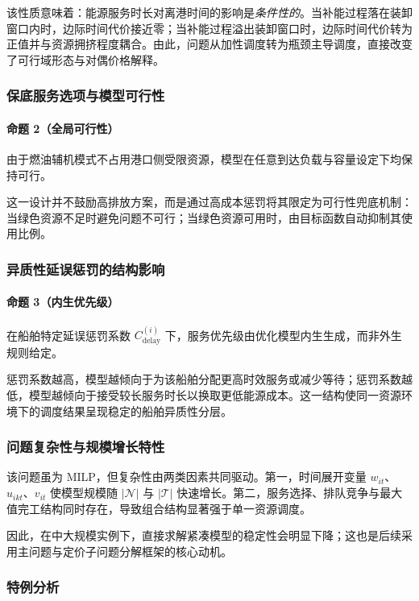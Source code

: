 \documentclass[UTF8, a4paper, 12pt]{ctexart}
\theoremstyle{plain}
\theoremstyle{definition}
\theoremstyle{remark}
\begin{document}
该性质意味着：能源服务时长对离港时间的影响是\emph{条件性的}。当补能过程落在装卸窗口内时，边际时间代价接近零；当补能过程溢出装卸窗口时，边际时间代价转为正值并与资源拥挤程度耦合。由此，问题从加性调度转为瓶颈主导调度，直接改变了可行域形态与对偶价格解释。

\subsubsection{保底服务选项与模型可行性}

\paragraph{命题 2（全局可行性）}
由于燃油辅机模式不占用港口侧受限资源，模型在任意到达负载与容量设定下均保持可行。

这一设计并不鼓励高排放方案，而是通过高成本惩罚将其限定为可行性兜底机制：当绿色资源不足时避免问题不可行；当绿色资源可用时，由目标函数自动抑制其使用比例。

\subsubsection{异质性延误惩罚的结构影响}

\paragraph{命题 3（内生优先级）}
在船舶特定延误惩罚系数 $C^{(i)}_{\text{delay}}$ 下，服务优先级由优化模型内生生成，而非外生规则给定。

惩罚系数越高，模型越倾向于为该船舶分配更高时效服务或减少等待；惩罚系数越低，模型越倾向于接受较长服务时长以换取更低能源成本。这一结构使同一资源环境下的调度结果呈现稳定的船舶异质性分层。

\subsubsection{问题复杂性与规模增长特性}

该问题虽为 MILP，但复杂性由两类因素共同驱动。第一，时间展开变量 $w_{it}$、$u_{ikt}$、$v_{it}$ 使模型规模随 $|\mathcal{N}|$ 与 $|\mathcal{T}|$ 快速增长。第二，服务选择、排队竞争与最大值完工结构同时存在，导致组合结构显著强于单一资源调度。

因此，在中大规模实例下，直接求解紧凑模型的稳定性会明显下降；这也是后续采用主问题与定价子问题分解框架的核心动机。

\subsubsection{特例分析}
\end{document}
